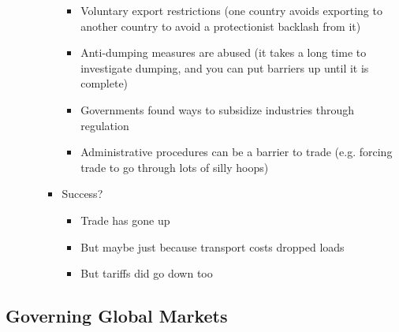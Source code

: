 \documentclass[11pt]{article}
\begin{document}
\begin{itemize}
\begin{itemize}
\begin{itemize}
\begin{itemize}
\item Voluntary export restrictions (one country avoids exporting to another
country to avoid a protectionist backlash from it)
\item Anti-dumping measures are abused (it takes a long time to investigate
dumping, and you can put barriers up until it is complete)
\item Governments found ways to subsidize industries through regulation
\item Administrative procedures can be a barrier to trade (e.g. forcing
trade to go through lots of silly hoops)
\end{itemize}
\item Success?
\begin{itemize}
\item Trade has gone up
\item But maybe just because transport costs dropped loads
\item But tariffs did go down too
\end{itemize}
\end{itemize}
\end{itemize}
\end{itemize}
\subsection{Governing Global Markets}
\label{sec:orgeb55adb}
\end{document}
